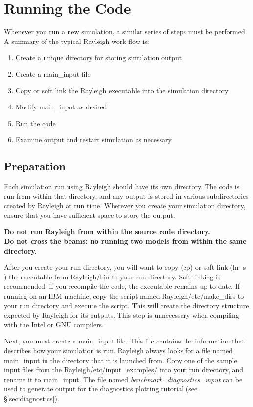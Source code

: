 \clearpage
\section{Running the Code}\label{sec:running}
Whenever you run a new simulation, a similar series of steps must be performed.  A summary of the typical Rayleigh work flow is:
\begin{enumerate}
\item Create a unique directory for storing simulation output
\item Create a main\_input file
\item Copy or soft link the Rayleigh executable into the simulation directory
\item Modify main\_input as desired
\item Run the code
\item Examine output and restart simulation as necessary
\end{enumerate}

\subsection{Preparation}
Each simulation run using Rayleigh should have its own directory.  The code is run from within that directory, and any output is stored in various subdirectories created by Rayleigh at run time.  Wherever you create your simulation directory, ensure that you have sufficient space to store the output.

\textbf{Do not run Rayleigh from within the source code directory.
\\ 
Do not cross the beams: no running two models from within the same directory.}

After you create your run directory, you will want to copy (cp) or soft link (ln -s ) the executable from Rayleigh/bin to your run directory.  Soft-linking is recommended; if you recompile the code, the executable remains up-to-date.  If running on an IBM machine, copy the script named Rayleigh/etc/make\_dirs to your run directory and execute the script.  This will create the directory structure expected by Rayleigh for its outputs.  This step is unnecessary when compiling with the Intel or GNU compilers.

Next, you must create a main\_input file.  This file contains the information that describes how your simulation is run.  Rayleigh always looks for a file named main\_input in the directory that it is launched from.  Copy one of the sample input files from the Rayleigh/etc/input\_examples/ into your run directory, and rename it to main\_input.  The file named \textit{benchmark\_diagnostics\_input} can be used to generate output for the diagnostics plotting tutorial (see \S \ref{sec:diagnostics}). 

